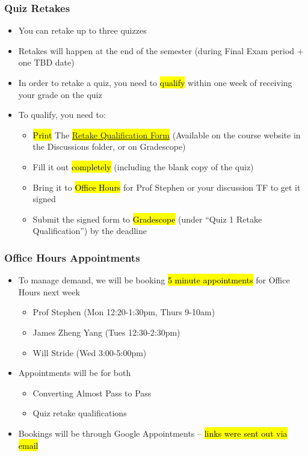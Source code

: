 \begin{frame}
\frametitle{Quiz Retakes}
    \begin{itemize}
        \item You can retake up to three quizzes
        \item Retakes will happen at the end of the semester (during Final Exam period + one TBD date)
        \item In order to retake a quiz, you need to \hl{qualify} within one week of receiving your grade on the quiz
        \item To qualify, you need to:
        \begin{itemize}
            \item \hl{Print} The \hl{\href{https://learn.bu.edu/ultra/courses/_246685_1/outline/file/_16630786_1}{Retake Qualification Form}} (Available on the course website in the Discussions folder, or on Gradescope)
            \item Fill it out \hl{completely} (including the blank copy of the quiz)
            \item Bring it to \hl{Office Hours} for Prof Stephen or your discussion TF to get it signed
            \item Submit the signed form to \hl{Gradescope} (under ``Quiz 1 Retake Qualification'') by the deadline
        \end{itemize}
    \end{itemize}
\end{frame}

\begin{frame}
    \frametitle{Office Hours Appointments}
    \begin{itemize}
        \item To manage demand, we will be booking \hl{5 minute appointments} for Office Hours next week
        \begin{itemize}
            \item Prof Stephen (Mon 12:20-1:30pm, Thurs 9-10am)
            \item James Zheng Yang (Tues 12:30-2:30pm)
            \item Will Stride (Wed 3:00-5:00pm)
        \end{itemize}
        \item Appointments will be for both
        \begin{itemize}
            \item Converting Almost Pass to Pass
            \item Quiz retake qualifications
        \end{itemize}
        \item Bookings will be through Google Appointments -- \hl{links were sent out via email}
    \end{itemize}
\end{frame}

